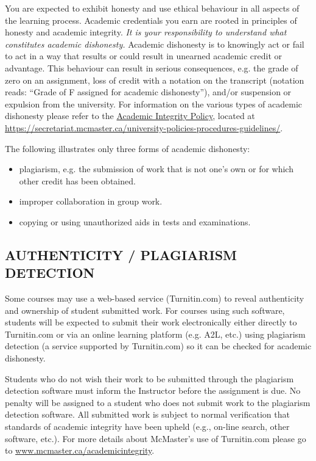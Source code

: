 \documentclass[12pt]{article}
\begin{document}
You are expected to exhibit honesty and use ethical behaviour in all
aspects of the learning process. Academic credentials you earn are
rooted in principles of honesty and academic integrity.  \emph{It is
  your responsibility to understand what constitutes academic
  dishonesty.}  Academic dishonesty is to knowingly act or fail to act
in a way that results or could result in unearned academic credit or
advantage. This behaviour can result in serious consequences, e.g. the
grade of zero on an assignment, loss of credit with a notation on the
transcript (notation reads: “Grade of F assigned for academic
dishonesty”), and/or suspension or expulsion from the university. For
information on the various types of academic dishonesty please refer
to the
\href{https://secretariat.mcmaster.ca/app/uploads/Academic-Integrity-Policy-1-1.pdf}{Academic
  Integrity Policy}, located at
\url{https://secretariat.mcmaster.ca/university-policies-procedures-guidelines/}.

The following illustrates only three forms of academic dishonesty: 
\begin{itemize}
\item	plagiarism, e.g. the submission of work that is not one’s own or for which other credit has been obtained.
\item	improper collaboration in group work. 
\item	copying or using unauthorized aids in tests and examinations. 
\end{itemize}


\subsection*{AUTHENTICITY / PLAGIARISM DETECTION}

Some courses may use a web-based service (Turnitin.com) to reveal
authenticity and ownership of student submitted work. For courses
using such software, students will be expected to submit their work
electronically either directly to Turnitin.com or via an online
learning platform (e.g. A2L, etc.) using plagiarism detection (a
service supported by Turnitin.com) so it can be checked for academic
dishonesty.

Students who do not wish their work to be submitted through the
plagiarism detection software must inform the Instructor before the
assignment is due. No penalty will be assigned to a student who does
not submit work to the plagiarism detection software. All submitted
work is subject to normal verification that standards of academic
integrity have been upheld (e.g., on-line search, other software,
etc.). For more details about McMaster’s use of Turnitin.com please go
to \url{www.mcmaster.ca/academicintegrity}.
\end{document}
